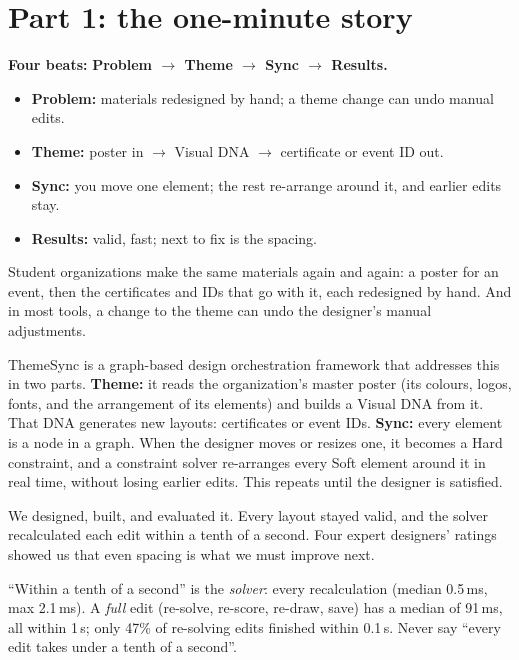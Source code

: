 \documentclass[10pt,a4paper]{article}
\begin{document}
\section{Part 1: the one-minute story}

\textbf{Four beats:} \textbf{Problem $\to$ Theme $\to$ Sync $\to$ Results.}
\begin{itemize}
\item \textbf{Problem:} materials redesigned by hand; a theme change can undo manual edits.
\item \textbf{Theme:} poster in $\to$ Visual DNA $\to$ certificate or event ID out.
\item \textbf{Sync:} you move one element; the rest re-arrange around it, and earlier edits stay.
\item \textbf{Results:} valid, fast; next to fix is the spacing.
\end{itemize}

\begin{key}
\small
Student organizations make the same materials again and again: a poster for an event, then the certificates and IDs that go with it, each redesigned by hand. And in most tools, a change to the theme can undo the designer's manual adjustments.

ThemeSync is a graph-based design orchestration framework that addresses this in two parts. \textbf{Theme:} it reads the organization's master poster (its colours, logos, fonts, and the arrangement of its elements) and builds a Visual DNA from it. That DNA generates new layouts: certificates or event IDs. \textbf{Sync:} every element is a node in a graph. When the designer moves or resizes one, it becomes a Hard constraint, and a constraint solver re-arranges every Soft element around it in real time, without losing earlier edits. This repeats until the designer is satisfied.

We designed, built, and evaluated it. Every layout stayed valid, and the solver recalculated each edit within a tenth of a second. Four expert designers' ratings showed us that even spacing is what we must improve next.
\end{key}

\begin{trap}
``Within a tenth of a second'' is the \emph{solver}: every recalculation (median 0.5\,ms, max 2.1\,ms). A \emph{full} edit (re-solve, re-score, re-draw, save) has a median of 91\,ms, all within 1\,s; only 47\% of re-solving edits finished within 0.1\,s. Never say ``every edit takes under a tenth of a second''.
\end{trap}
\end{document}

